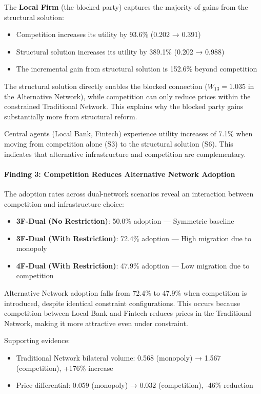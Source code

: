 The \textbf{Local Firm} (the blocked party) captures the majority of gains from the structural solution:
\begin{itemize}
    \item Competition increases its utility by 93.6\% (0.202 → 0.391)
    \item Structural solution increases its utility by 389.1\% (0.202 → 0.988)
    \item The incremental gain from structural solution is 152.6\% beyond competition
\end{itemize}

The structural solution directly enables the blocked connection ($W_{13} = 1.035$ in the Alternative Network), while competition can only reduce prices within the constrained Traditional Network. This explains why the blocked party gains substantially more from structural reform.

Central agents (Local Bank, Fintech) experience utility increases of 7.1\% when moving from competition alone (S3) to the structural solution (S6). This indicates that alternative infrastructure and competition are complementary.

\paragraph{Finding 3: Competition Reduces Alternative Network Adoption}

The adoption rates across dual-network scenarios reveal an interaction between competition and infrastructure choice:

\begin{itemize}
    \item \textbf{3F-Dual (No Restriction)}: 50.0\% adoption — Symmetric baseline
    \item \textbf{3F-Dual (With Restriction)}: 72.4\% adoption — High migration due to monopoly
    \item \textbf{4F-Dual (With Restriction)}: 47.9\% adoption — Low migration due to competition
\end{itemize}

Alternative Network adoption falls from 72.4\% to 47.9\% when competition is introduced, despite identical constraint configurations. This occurs because competition between Local Bank and Fintech reduces prices in the Traditional Network, making it more attractive even under constraint.

Supporting evidence:
\begin{itemize}
    \item Traditional Network bilateral volume: 0.568 (monopoly) → 1.567 (competition), +176\% increase
    \item Price differential: 0.059 (monopoly) → 0.032 (competition), -46\% reduction
\end{itemize}

